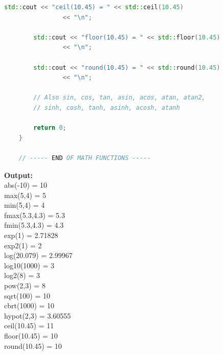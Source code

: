 \documentclass[12pt , a4paper]{article}
\begin{document}
\begin{lstlisting}[language=C++]
	    std::cout << "ceil(10.45) = " << std::ceil(10.45)
	            << "\n";
	
	    std::cout << "floor(10.45) = " << std::floor(10.45)
	            << "\n";
	
	    std::cout << "round(10.45) = " << std::round(10.45)
	            << "\n";
	
	    // Also sin, cos, tan, asin, acos, atan, atan2,
	    // sinh, cosh, tanh, asinh, acosh, atanh
	
	    return 0;
	}
	
	// ----- END OF MATH FUNCTIONS -----
	\end{lstlisting}

	\begin{tcolorbox}
	\textbf{Output:}\\
	abs(-10) = 10\\
	max(5,4) = 5\\
	min(5,4) = 4\\
	fmax(5.3,4.3) = 5.3\\
	fmin(5.3,4.3) = 4.3\\
	exp(1) = 2.71828\\
	exp2(1) = 2\\
	log(20.079) = 2.99967\\
	log10(1000) = 3\\
	log2(8) = 3\\
	pow(2,3) = 8\\
	sqrt(100) = 10\\
	cbrt(1000) = 10\\
	hypot(2,3) = 3.60555\\
	ceil(10.45) = 11\\
	floor(10.45) = 10\\
	round(10.45) = 10\\
	\end{tcolorbox}
\newpage
%
%
\end{document}
